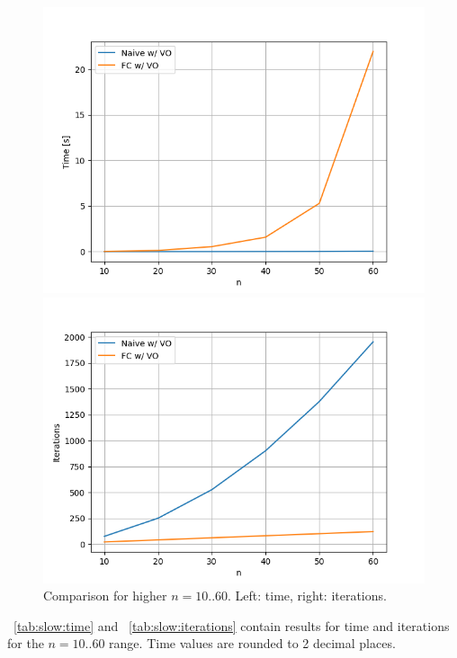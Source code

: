 \begin{figure}[ht]
	\centering
	\begin{minipage}{0.49\textwidth}
		\centering
		\includegraphics[width=\textwidth]{./Problems/slow_convergence/plots/time.png}
	\end{minipage}
	\hfill
	\begin{minipage}{0.49\textwidth}
		\centering
		\includegraphics[width=\textwidth]{./Problems/slow_convergence/plots/iterations.png}
	\end{minipage}
	\caption{Comparison for higher $n = 10..60$. Left: time, right: iterations.}
	\label{fig:slow:sidebyside}
\end{figure}

~\cref{tab:slow:time} and ~\cref{tab:slow:iterations} contain results for time and iterations for the $n = 10..60$ range. Time values are rounded to 2 decimal places.

